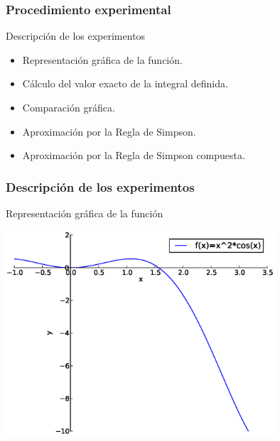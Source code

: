 \documentclass{beamer}
\begin{document}
\begin{frame}

  \frametitle{Procedimiento experimental}

  \begin{block}{Descripci\'on de los experimentos}
    \begin{itemize}
      \item <1-> Representación gráfica de la función.
      \pause
      \item <2-> Cálculo del valor exacto de la integral definida.
      \pause  
      \item <3-> Comparación gráfica.
      \pause
      \item <4-> Aproximación por la Regla de Simpson.
      \pause
      \item <5-> Aproximación por la Regla de Simpson compuesta.
    \end{itemize}
  \end{block}

\end{frame}
\begin{frame}

  \frametitle{Descripción de los experimentos}
  
  \begin{block}{Representación gráfica de la función}
    \begin{center}
      \includegraphics[width=0.75\textwidth]{img/grafica1.eps}
    \end{center}
  \end{block}

\end{frame}
\end{document}

